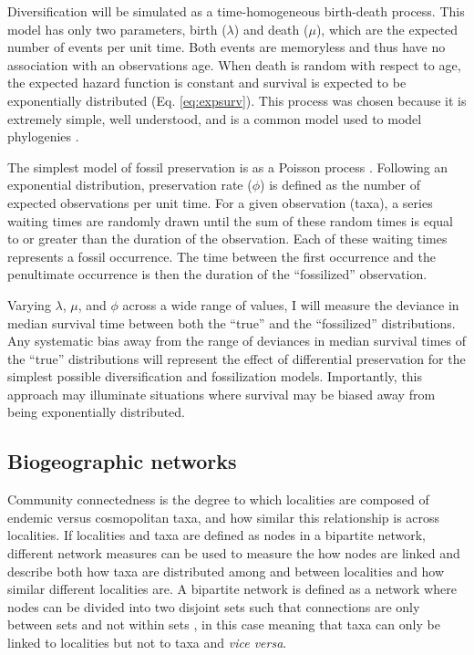 \documentclass[12pt,letterpaper]{article}
\begin{document}
Diversification will be simulated as a time-homogeneous birth-death process. This model has only two parameters, birth (\(\lambda\)) and death (\(\mu\)), which are the expected number of events per unit time. Both events are memoryless and thus have no association with an observations age. When death is random with respect to age, the expected hazard function is constant and survival is expected to be exponentially distributed (Eq. \ref{eq:expsurv}). This process was chosen because it is extremely simple, well understood, and is a common model used to model phylogenies \citep{Kendall1948,Nee1994a,Nee2006b,Raup1974a}. 

The simplest model of fossil preservation is as a Poisson process \citep{Foote1996e,Foote1997c,Solow1997,Strauss1989}. Following an exponential distribution, preservation rate (\(\phi\)) is defined as the number of expected observations per unit time. For a given observation (taxa), a series waiting times are randomly drawn until the sum of these random times is equal to or greater than the duration of the observation. Each of these waiting times represents a fossil occurrence. The time between the first occurrence and the penultimate occurrence is then the duration of the ``fossilized'' observation.

Varying \(\lambda\), \(\mu\), and \(\phi\) across a wide range of values, I will measure the deviance in median survival time between both the ``true'' and the ``fossilized'' distributions. Any systematic bias away from the range of deviances in median survival times of the ``true'' distributions will represent the effect of differential preservation for the simplest possible diversification and fossilization models. Importantly, this approach may illuminate situations where survival may be biased away from being exponentially distributed.


\subsection{Biogeographic networks} \label{sec:bionet}
Community connectedness is the degree to which localities are composed of endemic versus cosmopolitan taxa, and how similar this relationship is across localities. If localities and taxa are defined as nodes in a bipartite network, different network measures can be used to measure the how nodes are linked and describe both how taxa are distributed among and between localities and how similar different localities are. A bipartite network is defined as a network where nodes can be divided into two disjoint sets such that connections are only between sets and not within sets \citep{Diestel2005}, in this case meaning that taxa can only be linked to localities but not to taxa and \textit{vice versa}.
\end{document}

